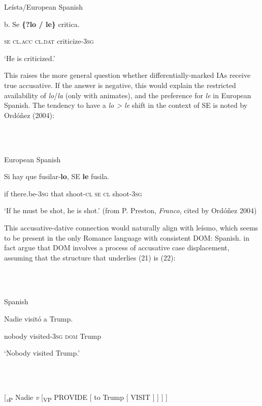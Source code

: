 \documentclass[output=paper]{langsci/langscibook}
\begin{document}
  Leísta/European Spanish

  b.   Se \textbf{\{?lo    /    le\}}       critica.      

            \textsc{se  cl.acc  cl.dat}   criticize\textsc{{}-3}\textsc{sg}

     ‘He is criticized.’

This raises the more general question whether differentially-marked IAs receive true accusative. If the answer is negative, this would explain the restricted availability of \textit{lo}/\textit{la} (only with animates), and the preference for \textit{le} in European Spanish. The tendency to have a \textit{lo > le} shift in the context of SE is noted by Ordóñez (2004):

\ea%
    \label{ex:key:20}
    \gll\\
        \\
    \glt
    \z

          European Spanish

Si hay                 que  fusilar-\textbf{lo},  SE \textbf{le} fusila.       

       if  there.be\textsc{{}-3}\textsc{sg}  that  shoot\textsc{{}-cl  se  cl}  shoot\textsc{{}-3}\textsc{sg}

  ‘If he must be shot, he is shot.’ (from P. Preston, \textit{Franco}, cited by Ordóñez 2004)

This accusative-dative connection would naturally align with leísmo, which seems to be present in the only Romance language with consistent DOM: Spanish. \citet{ColominaEtAl2017} in fact argue that DOM involves a process of accusative case displacement, assuming that the structure that underlies (21) is (22):

\ea%
    \label{ex:key:21}
    \gll\\
        \\
    \glt
    \z

          Spanish

Nadie    visitó             a          Trump.   

nobody  visited\textsc{{}-3}\textsc{sg  dom}   Trump

‘Nobody visited Trump.’

\ea%
    \label{ex:key:22}
    \gll\\
        \\
    \glt
    \z

          [\textit{\textsubscript{v}}\textsubscript{P} Nadie \textit{v} [\textsubscript{VP} PROVIDE [ to Trump [ VISIT ] ] ] ]
\end{document}
